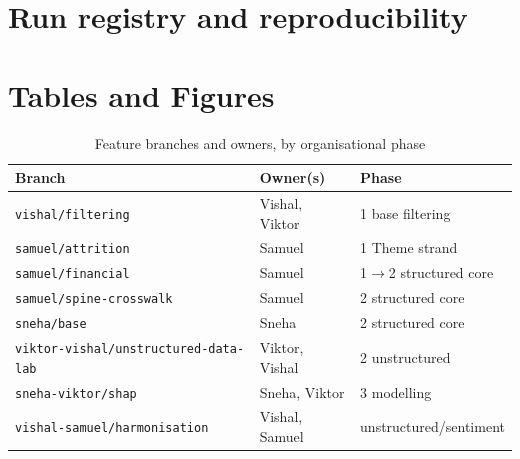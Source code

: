 \documentclass[    author={Samuel Menon Demelo; Sneha Saphala Ram Prasad; 
Viktor Ander Lindholm; Vishal Khatri},
               supervisor={Prof. Fernando Moreno-Pino},
                   degree={MSc},
                    title={Lloyds Commercial Banking Intelligence},
                 subtitle={Ranking SME Lending, Risk and Growth Prospects for Lloyds Banking Group},
                     type={},
                     year={2026}]{dissertation}
\newcommand{\note}[1]{}
\begin{document}

\chapter{Run registry and reproducibility}
\label{appx:runs}



\chapter{Tables and Figures}

\begin{collapsable}
\begin{table}[h]
\centering\small
\begin{tabular}{@{}lll@{}}
\toprule
\textbf{Branch} & \textbf{Owner(s)} & \textbf{Phase}\\
\midrule
\texttt{vishal/filtering} & Vishal, Viktor & 1 base filtering\\
\texttt{samuel/attrition} & Samuel & 1 Theme strand  \\
\texttt{samuel/financial}&Samuel     & 1$\to$2 structured core\\
\texttt{samuel/spine-crosswalk} & Samuel & 2 structured core \\
\texttt{sneha/base} & Sneha & 2 structured core\\
\texttt{viktor-vishal/unstructured-data-lab} & Viktor, Vishal & 2 unstructured \\
\texttt{sneha-viktor/shap} & Sneha, Viktor & 3 modelling \\
\texttt{vishal-samuel/harmonisation} & Vishal, Samuel & unstructured/sentiment
\\
\bottomrule

\end{tabular}

    \caption{Feature branches and owners, by organisational phase}
    \label{tab:branches}
\end{table}
\end{collapsable}
\end{document}

